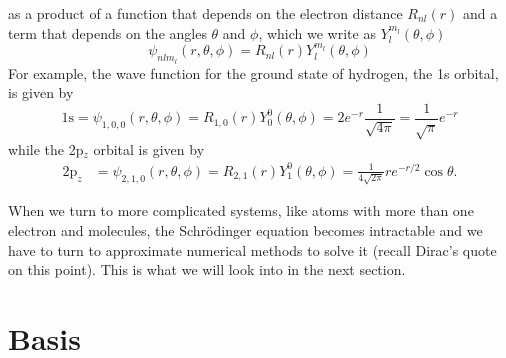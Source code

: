 \documentclass[../Main/chem371-notes.tex]{subfiles}
\begin{document}
 as a product of a function that depends on the electron distance $R_{nl}(r)$ and a term that depends on the angles $\theta$ and $\phi$, which we write as $Y_l^{m_l}(\theta,\phi)$
\begin{equation}
\psi_{nlm_l}(r,\theta,\phi) = R_{nl}(r) Y_l^{m_l}(\theta,\phi)
\end{equation}
For example, the wave function for the  ground state of hydrogen, the 1s orbital, is given by
\begin{equation}
\mathrm{1s} = \psi_{1,0,0}(r,\theta,\phi) = R_{1,0}(r) Y_0^0(\theta,\phi) = 2 e^{-r} \frac{1}{\sqrt{4\pi}} = \frac{1}{\sqrt{\pi}} e^{-r}
\end{equation}
while the 2p$_{z}$ orbital is given by
\begin{align}
\mathrm{2p}_{z} &= \psi_{2,1,0}(r,\theta,\phi) = R_{2,1}(r) Y_1^{0}(\theta,\phi) =
\frac{1}{4\sqrt{2 \pi}}   r e^{-r/2} \cos \theta.
\end{align}

When we turn to more complicated systems, like atoms with more than one electron and molecules, the Schr\"{o}dinger equation becomes intractable and we have to turn to approximate numerical methods to solve it (recall Dirac's quote on this point).
This is what we will look into in the next section.

\section{Basis}

\end{document}
